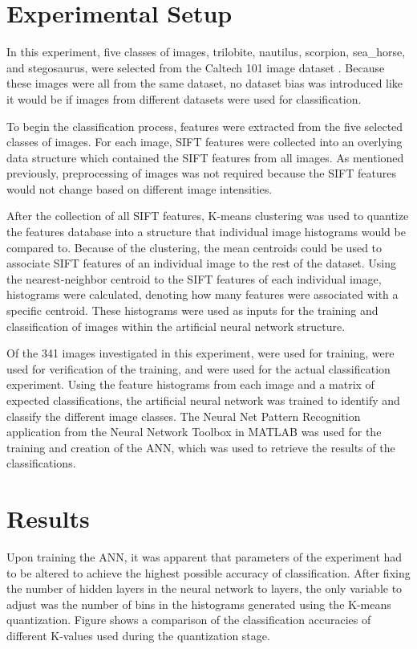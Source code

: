 \documentclass{article}
\begin{document}
\section{Experimental Setup} 
\label{sec:expsetup}

In this experiment, five classes of images, trilobite, nautilus, scorpion, sea\_horse, and stegosaurus, were selected from the Caltech 101 image dataset . Because these images were all from the same dataset, no dataset bias was introduced like it would be if images from different datasets were used for classification. 

To begin the classification process, features were extracted from the five selected classes of images. For each image, SIFT features were collected into an overlying data structure which contained the SIFT features from all images. As mentioned previously, preprocessing of images was not required because the SIFT features would not change based on different image intensities.

After the collection of all SIFT features, K-means clustering was used to quantize the features database into a structure that individual image histograms would be compared to.  Because of the clustering, the mean centroids could be used to associate SIFT features of an individual image to the rest of the dataset. Using the nearest-neighbor centroid to the SIFT features of each individual image, histograms were calculated, denoting how many features were associated with a specific centroid. These histograms were used as inputs for the training and classification of images within the artificial neural network structure.

Of the 341 images investigated in this experiment,  were used for training,  were used for verification of the training, and  were used for the actual classification experiment. Using the feature histograms from each image and a matrix of expected classifications, the artificial neural network was trained to identify and classify the different image classes. The Neural Net Pattern Recognition application from the Neural Network Toolbox in MATLAB was used for the training and creation of the ANN, which was used to retrieve the results of the classifications.

%
\section{Results}
\label{sec:results}
Upon training the ANN, it was apparent that parameters of the experiment had to be altered to achieve the highest possible accuracy of classification. After fixing the number of hidden layers in the neural network to  layers, the only variable to adjust was the number of bins in the histograms generated using the K-means quantization. Figure  shows a comparison of the classification accuracies of different K-values used during the quantization stage.
\end{document}
